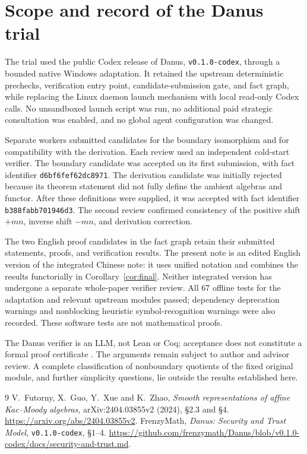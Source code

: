 \documentclass[11pt]{article}
\theoremstyle{definition}
\begin{document}
\appendix
\section{Scope and record of the Danus trial}

The trial used the public Codex release of Danus,
\texttt{v0.1.0-codex}, through a bounded native Windows adaptation.
It retained the upstream deterministic prechecks, verification entry
point, candidate-submission gate, and fact graph, while replacing
the Linux daemon launch mechanism with local read-only Codex calls.
No unsandboxed launch script was run, no additional paid strategic
consultation was enabled, and no global agent configuration was
changed.

Separate workers submitted candidates for the boundary isomorphism
and for compatibility with the derivation. Each review used an
independent cold-start verifier. The boundary candidate was accepted
on its first submission, with fact identifier
\texttt{d6bf6fef62dc8971}. The derivation candidate was initially
rejected because its theorem statement did not fully define the
ambient algebras and functor. After these definitions were supplied,
it was accepted with fact identifier \texttt{b388fabb701946d3}.
The second review confirmed consistency of the positive shift
\(+mn\), inverse shift \(-mn\), and derivation correction.

The two English proof candidates in the fact graph retain their
submitted statements, proofs, and verification results. The present
note is an edited English version of the integrated Chinese note:
it uses unified notation and combines the results functorially in
Corollary~\ref{cor:final}. Neither integrated version has undergone
a separate whole-paper verifier review. All 67 offline tests for
the adaptation and relevant upstream modules passed; dependency
deprecation warnings and nonblocking heuristic symbol-recognition
warnings were also recorded. These software tests are not
mathematical proofs.

The Danus verifier is an LLM, not Lean or Coq; acceptance does not
constitute a formal proof certificate \cite{DanusTrust}. The arguments
remain subject to author and advisor review. A complete classification
of nonboundary quotients of the fixed original module, and further
simplicity questions, lie outside the results established here.

\begin{thebibliography}{9}
V.~Futorny, X.~Guo, Y.~Xue and K.~Zhao,
\emph{Smooth representations of affine Kac--Moody algebras},
arXiv:2404.03855v2 (2024), \S2.3 and \S4.
\url{https://arxiv.org/abs/2404.03855v2}.
FrenzyMath, \emph{Danus: Security and Trust Model},
\texttt{v0.1.0-codex}, \S1--4.
\url{https://github.com/frenzymath/Danus/blob/v0.1.0-codex/docs/security-and-trust.md}.
\end{thebibliography}
\end{document}
